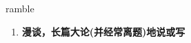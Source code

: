 
\begin{frame}
{\huge ramble}
\begin{center}
\begin{enumerate}\Large
  \item \textbf{漫谈，长篇大论(并经常离题)地说或写}
\end{enumerate}
\end{center}
\end{frame}
